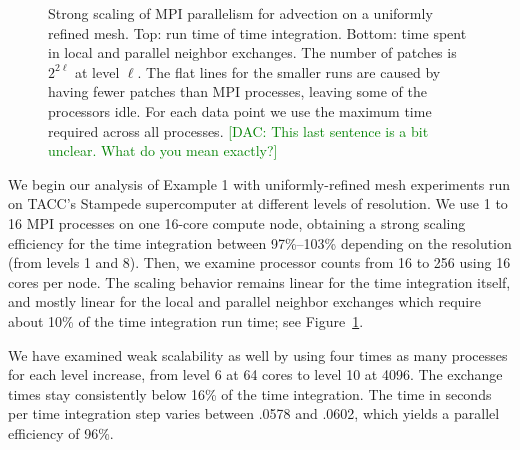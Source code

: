 \documentclass{IOS-Book-Article}     %
\newcommand{\comment}[1]{\textcolor{green}{[DAC: #1]}\xspace}
\newcommand{\Fig}[1]{Figure~\ref{fig:#1}}
\begin{document}
\begin{figure}
\begin{center}
\end{center}
\caption{Strong scaling of MPI parallelism for advection on a
  uniformly refined mesh.  Top: run time of time integration.  Bottom:
  time spent in local and parallel neighbor exchanges.  The number of
  patches is $2^{2 \ell}$ at level $\ell$.  The flat lines for the
  smaller runs are caused by having fewer patches than MPI processes,
  leaving some of the processors idle.  For each data point we use the
  maximum time required across all processes. \comment{This last
    sentence is a bit unclear.  What do you mean exactly?}}
\label{fig:uniscale}
\end{figure}%
We begin our analysis of Example 1 with uniformly-refined mesh experiments run on TACC's
Stampede supercomputer at different levels of resolution.
We use 1 to 16 MPI processes on one 16-core compute node, obtaining a strong
scaling efficiency for the time integration between 97\%--103\% depending on
the resolution (from levels 1 and 8).  Then, we examine processor counts from
16 to 256 using 16 cores per node.  The scaling behavior remains linear for
the time integration itself, and mostly linear for the local and parallel
neighbor exchanges which require about 10\% of the time integration run time;
see \Fig{uniscale}.

We have examined weak scalability as well by using four times as many processes
for each level increase, from level 6 at 64 cores to level 10 at 4096.  The
exchange times stay consistently below 16\% of the time integration.  The time
in seconds per time integration step varies between .0578 and .0602,
which yields a parallel efficiency of 96\%.
\end{document}
